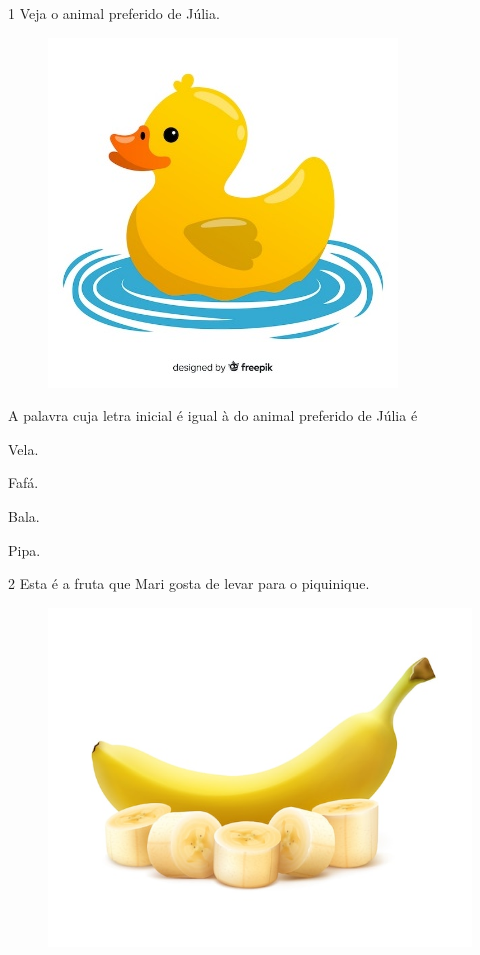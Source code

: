 \num{1} Veja o animal preferido de Júlia.

\begin{figure}[htpb!]
\centering
\includegraphics[width=.5\textwidth]{media/image174.jpeg}
\end{figure}


A palavra cuja letra inicial é igual à do animal preferido de Júlia é

\begin{escolha}
\item Vela.

\item Fafá.

\item Bala.

\item Pipa.
\end{escolha}

\num{2} Esta é a fruta que Mari gosta de levar para o piquinique.

\begin{figure}[htpb!]
\centering
\includegraphics[width=.5\textwidth]{media/image175.jpeg}
\end{figure}

